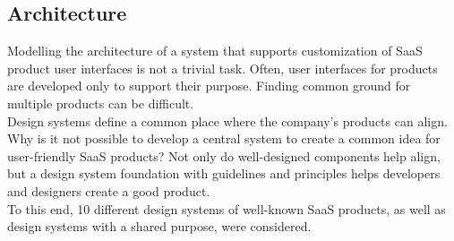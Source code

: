 \subsection{Architecture}
Modelling the architecture of a system that supports customization of SaaS product user interfaces is not a trivial task. Often, user interfaces for products are developed only to support their purpose. Finding common ground for multiple products can be difficult.  \\
Design systems define a common place where the company's products can align. Why is it not possible to develop a central system to create a common idea for user-friendly SaaS products? Not only do well-designed components help align, but a design system foundation with guidelines and principles helps developers and designers create a good product. \\
To this end, 10 different design systems of well-known SaaS products, as well as design systems with a shared purpose, were considered. 
